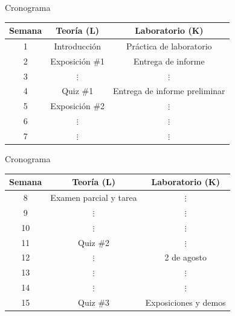 \documentclass[xcolor=dvipsnames,handout]{beamer}
\newcommand{\pageframe}[1]{\frame{\begin{center}{ \Huge #1 }\end{center}}}
\begin{document}
\pageframe{Cronograma}

\begin{frame}{Cronograma}
 \begin{center}
  \begin{tabular}{|c|c|c|}\hline
   Semana & \multicolumn{1}{c|}{Teoría (L)} & \multicolumn{1}{c|}{Laboratorio (K)} \\ \hline \hline
   1 & Introducción & Práctica de laboratorio \\ \hline
   2 & Exposición \#1 & Entrega de informe \\ \hline
   3 & \multicolumn{1}{c|}{$\vdots$} & \multicolumn{1}{c|}{$\vdots$} \\ \hline
   4 & Quiz \#1 & Entrega de informe preliminar \\ \hline
   5 & Exposición \#2 & \multicolumn{1}{c|}{$\vdots$}     \\ \hline
   6 & \multicolumn{1}{c|}{$\vdots$} & \multicolumn{1}{c|}{$\vdots$}     \\ \hline
   7 & \multicolumn{1}{c|}{$\vdots$} & \multicolumn{1}{c|}{$\vdots$}     \\ \hline
  \end{tabular}
 \end{center}
\end{frame}

\begin{frame}{Cronograma}
 \begin{center}
  \begin{tabular}{|c|c|c|}\hline
   Semana & \multicolumn{1}{c|}{Teoría (L)} & \multicolumn{1}{c|}{Laboratorio (K)} \\ \hline \hline
   8 & Examen parcial y tarea & \multicolumn{1}{c|}{$\vdots$}     \\ \hline
   9 & \multicolumn{1}{c|}{$\vdots$} & \multicolumn{1}{c|}{$\vdots$}     \\ \hline
   10 & \multicolumn{1}{c|}{$\vdots$} & \multicolumn{1}{c|}{$\vdots$}     \\ \hline
   11 & Quiz \#2 & \multicolumn{1}{c|}{$\vdots$}     \\ \hline
   12 & \multicolumn{1}{c|}{$\vdots$} & 2 de agosto \\ \hline
   13 & \multicolumn{1}{c|}{$\vdots$} & \multicolumn{1}{c|}{$\vdots$} \\ \hline
   14 & \multicolumn{1}{c|}{$\vdots$} & \multicolumn{1}{c|}{$\vdots$}  \\\hline
   15 & Quiz \#3 & Exposiciones y demos  \\ \hline
  \end{tabular}

 \end{center}

\end{frame}
\end{document}
